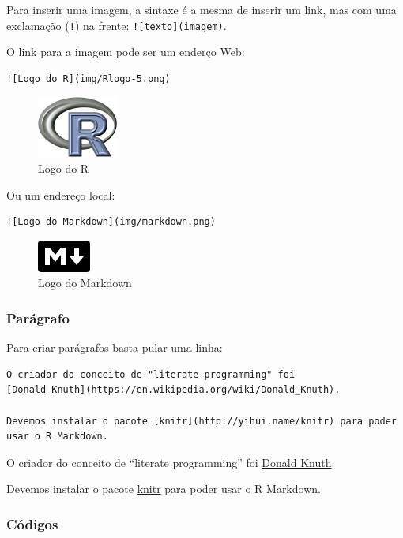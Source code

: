 \documentclass[10pt,a4paper]{book}
\begin{document}
Para inserir uma imagem, a sintaxe é a mesma de inserir um link, mas com
uma exclamação (\texttt{!}) na frente: \texttt{!{[}texto{]}(imagem)}.

O link para a imagem pode ser um enderço Web:

\begin{verbatim}
![Logo do R](img/Rlogo-5.png)
\end{verbatim}

\begin{figure}
\centering
\includegraphics{img/Rlogo-5.png}
\caption{Logo do R}
\end{figure}

Ou um endereço local:

\begin{verbatim}
![Logo do Markdown](img/markdown.png)
\end{verbatim}

\begin{figure}
\centering
\includegraphics{img/markdown.png}
\caption{Logo do Markdown}
\end{figure}

\subsubsection*{Parágrafo}\label{paragrafo}


Para criar parágrafos basta pular uma linha:

\begin{verbatim}
O criador do conceito de "literate programming" foi
[Donald Knuth](https://en.wikipedia.org/wiki/Donald_Knuth).

Devemos instalar o pacote [knitr](http://yihui.name/knitr) para poder
usar o R Markdown.
\end{verbatim}

O criador do conceito de ``literate programming'' foi
\href{https://en.wikipedia.org/wiki/Donald_Knuth}{Donald Knuth}.

Devemos instalar o pacote \href{http://yihui.name/knitr}{knitr} para
poder usar o R Markdown.

\subsubsection*{Códigos}\label{codigos}
\end{document}
